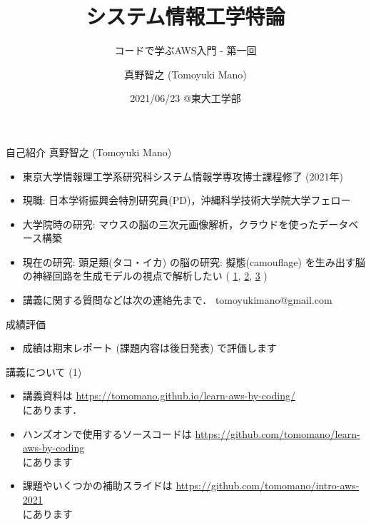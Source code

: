 \documentclass[unicode,11pt]{beamer}
\title{システム情報工学特論}
\subtitle{コードで学ぶAWS入門 - 第一回}
\author{真野智之 (Tomoyuki Mano)}
\institute[OIST]{Okinawa Institute of Science and Technology}
\date{2021/06/23 @東大工学部}
\begin{document}
\frame{\titlepage}

\begin{frame}{自己紹介}
真野智之 (Tomoyuki Mano)
\begin{itemize}
    \item 東京大学情報理工学系研究科システム情報学専攻博士課程修了 (2021年)
    \item 現職: 日本学術振興会特別研究員(PD)，沖縄科学技術大学院大学フェロー
    \item 大学院時の研究: マウスの脳の三次元画像解析，クラウドを使ったデータベース構築
    \item 現在の研究: 頭足類(タコ・イカ) の脳の研究: 擬態(camouflage) を生み出す脳の神経回路を生成モデルの視点で解析したい
    (
    \href{https://twitter.com/CephWarden/status/1142083856893263872}{1},
    \href{https://twitter.com/CephWarden/status/1384644335069667334}{2},
    \href{https://twitter.com/CephWarden/status/1232307456346181632}{3}
    )
    \item 講義に関する質問などは次の連絡先まで． tomoyukimano@gmail.com
\end{itemize}
\end{frame}

\begin{frame}{成績評価}
\begin{itemize}
    \item 成績は期末レポート (課題内容は後日発表) で評価します
\end{itemize}
\end{frame}

\begin{frame}{講義について (1)}
\begin{itemize}
    \item 講義資料は
    \url{https://tomomano.github.io/learn-aws-by-coding/}\\
    にあります．
    \item ハンズオンで使用するソースコードは \url{https://github.com/tomomano/learn-aws-by-coding}\\
    にあります
    \item 課題やいくつかの補助スライドは
    \url{https://github.com/tomomano/intro-aws-2021}\\
    にあります
\end{itemize}
\end{frame}
\end{document}

